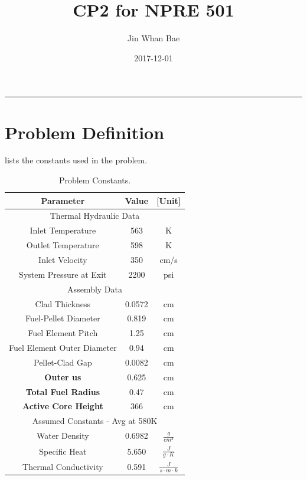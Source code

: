 \documentclass[12pt,letterpaper]{article}
\title{CP2 for NPRE 501}
\author{Jin Whan Bae}
\date{2017-12-01}
\begin{document}
	
	\maketitle
	\hrule
	\onehalfspacing
	\thispagestyle{empty}

\section*{Problem Definition}

 lists the constants used in the problem.


\begin{table}[h]
     \centering
    \begin{tabular}{ccc}
       \hline
       Parameter & Value & [Unit] \\
       \hline
       \multicolumn{3}{c}{Thermal Hydraulic Data}\\
       \hline
       Inlet Temperature & 563 & K \\
       Outlet Temperature & 598 & K \\
       Inlet Velocity & 350 & cm/s \\
       System Pressure at Exit & 2200 & psi \\
       \hline
       \multicolumn{3}{c}{Assembly Data} \\
       \hline
       Clad Thickness & 0.0572 & cm \\
       Fuel-Pellet Diameter & 0.819 & cm \\
       Fuel Element Pitch & 1.25 & cm \\
       Fuel Element Outer Diameter & 0.94& cm \\
       Pellet-Clad Gap & 0.0082 & cm \\
       \textbf{Outer us} & 0.625 & cm \\
       \textbf{Total Fuel Radius} & 0.47 & cm \\
       \textbf{Active Core Height} & 366 & cm \\
       \hline
       \multicolumn{3}{c}{Assumed Constants - Avg at 580K} \\
       \hline
       Water Density & 0.6982 & $\frac{g}{cm^3}$ \\
       Specific Heat & 5.650 & $\frac{J}{g\cdot K}$ \\
       Thermal Conductivity & 0.591 & $\frac{J}{s\cdot m\cdot k}$ \\       
       \hline
    \end{tabular}
    \caption {Problem Constants.}
    \label{tab:constants}
\end{table}
\end{document}
